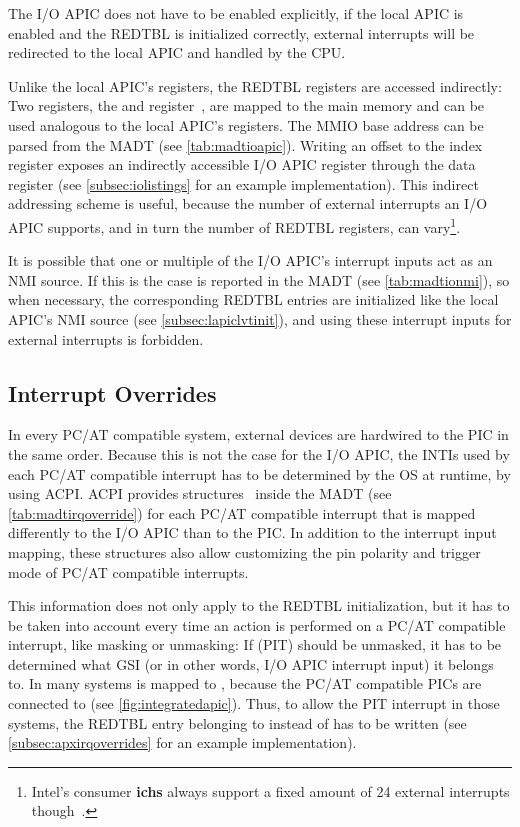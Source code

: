 The I/O APIC does not have to be enabled explicitly, if the local APIC is enabled and the REDTBL is initialized correctly, external interrupts will be redirected to the local APIC and handled by the CPU\@.

Unlike the local APIC's registers, the REDTBL registers are accessed indirectly: Two registers, the  and  register~\autocite[sec.~9.5.1]{ich5}, are mapped to the main memory and can be used analogous to the local APIC's registers.
The MMIO base address can be parsed from the MADT (see \autoref{tab:madtioapic}).
Writing an offset to the index register exposes an indirectly accessible I/O APIC register through the data register (see \autoref{subsec:iolistings} for an example implementation).
This indirect addressing scheme is useful, because the number of external interrupts an I/O APIC supports, and in turn the number of REDTBL registers, can vary\footnote{
  Intel's consumer \textbf{\glspl{ich}} always support a fixed amount of 24 external interrupts though~\autocite[sec.~9.5.7]{ich5}.}.

It is possible that one or multiple of the I/O APIC's interrupt inputs act as an NMI source.
If this is the case is reported in the MADT (see \autoref{tab:madtionmi}), so when necessary, the corresponding REDTBL entries are initialized like the local APIC's NMI source (see \autoref{subsec:lapiclvtinit}), and using these interrupt inputs for external interrupts is forbidden.

\subsection{Interrupt Overrides}
\label{subsec:ioapicpcat}

In every PC/AT compatible system, external devices are hardwired to the PIC in the same order.
Because this is not the case for the I/O APIC, the INTIs used by each PC/AT compatible interrupt has to be determined by the OS at runtime, by using ACPI\@.
ACPI provides  structures~\autocite[sec.~5.2.8.3.1]{acpi1} inside the MADT (see \autoref{tab:madtirqoverride}) for each PC/AT compatible interrupt that is mapped differently to the I/O APIC than to the PIC\@.
In addition to the interrupt input mapping, these structures also allow customizing the pin polarity and trigger mode of PC/AT compatible interrupts.

This information does not only apply to the REDTBL initialization, but it has to be taken into account every time an action is performed on a PC/AT compatible interrupt, like masking or unmasking: If  (PIT) should be unmasked, it has to be determined what GSI (or in other words, I/O APIC interrupt input) it belongs to.
In many systems  is mapped to , because the PC/AT compatible PICs are connected to  (see \autoref{fig:integratedapic}).
Thus, to allow the PIT interrupt in those systems, the REDTBL entry belonging to  instead of  has to be written (see \autoref{subsec:apxirqoverrides} for an example implementation).


